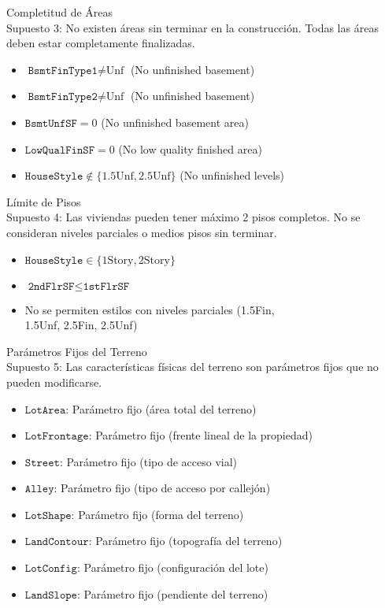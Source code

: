 {Completitud de Áreas}\\
{Supuesto 3:} No existen áreas sin terminar en la construcción. Todas las áreas deben estar completamente finalizadas.
\begin{itemize}
    \item $\texttt{BsmtFinType1} \neq \text{Unf}$ (No unfinished basement)
    \item $\texttt{BsmtFinType2} \neq \text{Unf}$ (No unfinished basement)
    \item $\texttt{BsmtUnfSF} = 0$ (No unfinished basement area)
    \item $\texttt{LowQualFinSF} = 0$ (No low quality finished area)
    \item $\texttt{HouseStyle} \notin \{\text{1.5Unf}, \text{2.5Unf}\}$ (No unfinished levels)
\end{itemize}

{Límite de Pisos}\\
{Supuesto 4:} Las viviendas pueden tener máximo 2 pisos completos. No se consideran niveles parciales o medios pisos sin terminar.
\begin{itemize}
    \item $\texttt{HouseStyle} \in \{\text{1Story}, \text{2Story}\}$
    \item $\texttt{2ndFlrSF} \leq \texttt{1stFlrSF}$
    \item No se permiten estilos con niveles parciales (1.5Fin,\\ 1.5Unf, 2.5Fin, 2.5Unf)
\end{itemize}

{Parámetros Fijos del Terreno}\\
{Supuesto 5:} Las características físicas del terreno son parámetros fijos que no pueden modificarse.
\begin{itemize}
    \item $\texttt{LotArea}$: Parámetro fijo (área total del terreno)
    \item $\texttt{LotFrontage}$: Parámetro fijo (frente lineal de la propiedad)
    \item $\texttt{Street}$: Parámetro fijo (tipo de acceso vial)
    \item $\texttt{Alley}$: Parámetro fijo (tipo de acceso por callejón)
    \item $\texttt{LotShape}$: Parámetro fijo (forma del terreno)
    \item $\texttt{LandContour}$: Parámetro fijo (topografía del terreno)
    \item $\texttt{LotConfig}$: Parámetro fijo (configuración del lote)
    \item $\texttt{LandSlope}$: Parámetro fijo (pendiente del terreno)
\end{itemize}


